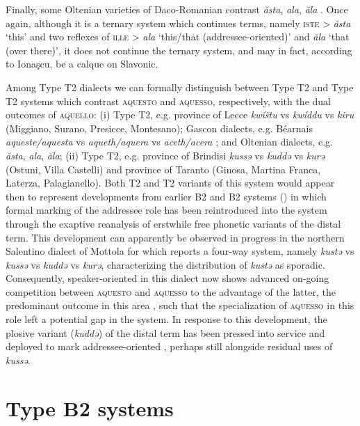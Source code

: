 \documentclass[output=paper]{langsci/langscibook}
\begin{document}
Finally, some Oltenian varieties of Daco-Romanian contrast \emph{ăsta},
\emph{ala}, \emph{ăla} \citep{Ionascu:1960a}. Once again, although it is a
ternary system which continues  terms, namely \textsc{iste} > \emph{ăsta}
‘this’ and two reflexes of \textsc{ille} > \emph{ala} ‘this/that
(addressee-oriented)’ and \emph{ăla} ‘that (over there)’, it does not continue
the  ternary system, and may in fact, according to Ionaşcu, be a calque on
Slavonic.

Among Type T2 dialects we can formally distinguish between Type
T2 and Type T2 systems which contrast \textsc{aquesto} and
\textsc{aquesso}, respectively, with the dual outcomes of \textsc{aquello}: (i)
Type T2, e.g. province of Lecce \emph{kwíštu} vs \emph{kwíddu} vs
\emph{kiru} (Miggiano, Surano, Presicce, Montesano); Gascon dialects, e.g.
Béarnais \emph{aqueste/aquesta} vs \emph{aqueth/aquera} vs \emph{aceth/acera}
\citep[188]{Rohlfs:1970ab}; and Oltenian dialects, e.g. \emph{ăsta},
\emph{ala}, \emph{ăla}; (ii) Type T2, e.g. province of Brindisi
\emph{kussə} vs \emph{kuddə} vs \emph{kurə} (Ostuni, Villa Castelli) and
province of Taranto (Ginosa, Martina Franca, Laterza, Palagianello). Both
T2 and T2 variants of this system would appear then to
represent developments from earlier B2 and B2 systems
() in which formal marking of the
addressee role has been reintroduced into the system through the exaptive
reanalysis of erstwhile free phonetic variants of the distal term. This
development can apparently be observed in progress in the northern Salentino
dialect of Mottola for which \citet[157, 160]{Mancarella:1998a} reports a
four-way system, namely \emph{kustə} vs \emph{kussə} vs \emph{kuddə} vs
\emph{kurə}, characterizing the distribution of \emph{kustə} as sporadic.
Consequently, speaker-oriented  in this dialect now shows advanced
on-going competition between \textsc{aquesto} and \textsc{aquesso} to the
advantage of the latter, the predominant outcome in this area
\parencite[157]{Mancarella:1998a}, such that the specialization of
\textsc{aquesso} in this role left a potential gap in the system. In response
to this development, the plosive variant (\emph{kuddə}) of the distal term has
been pressed into service and deployed to mark addressee-oriented ,
perhaps still alongside residual uses of \emph{kussə}.

\section{Type B2 systems}\label{bkm:Ref370483109}
\end{document}
